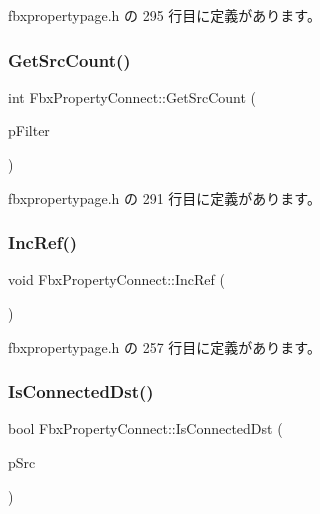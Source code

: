  fbxpropertypage.\+h の 295 行目に定義があります。

\mbox{\label{class_fbx_property_connect_a44f9ad9bc5eb7d3127a506fa8e2ea244}} 
\subsubsection{\texorpdfstring{Get\+Src\+Count()}{GetSrcCount()}}
{\footnotesize\ttfamily int Fbx\+Property\+Connect\+::\+Get\+Src\+Count (\begin{DoxyParamCaption}\item[{\hyperlink{class_fbx_connection_point_filter}{Fbx\+Connection\+Point\+Filter} $\ast$}]{p\+Filter }\end{DoxyParamCaption})\hspace{0.3cm}{\ttfamily [inline]}}



 fbxpropertypage.\+h の 291 行目に定義があります。

\mbox{\label{class_fbx_property_connect_ad1c6573c7343eab1e833824f02be39e1}} 
\subsubsection{\texorpdfstring{Inc\+Ref()}{IncRef()}}
{\footnotesize\ttfamily void Fbx\+Property\+Connect\+::\+Inc\+Ref (\begin{DoxyParamCaption}{ }\end{DoxyParamCaption})\hspace{0.3cm}{\ttfamily [inline]}}



 fbxpropertypage.\+h の 257 行目に定義があります。

\mbox{\label{class_fbx_property_connect_a3abc22f00d2507d6b1d77739a1add59d}} 
\subsubsection{\texorpdfstring{Is\+Connected\+Dst()}{IsConnectedDst()}}
{\footnotesize\ttfamily bool Fbx\+Property\+Connect\+::\+Is\+Connected\+Dst (\begin{DoxyParamCaption}\item[{\hyperlink{class_fbx_property_connect}{Fbx\+Property\+Connect} $\ast$}]{p\+Src }\end{DoxyParamCaption})\hspace{0.3cm}{\ttfamily [inline]}}



